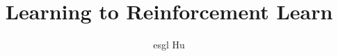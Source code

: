 \documentclass[12pt,a4paper]{article}
\begin{document}
\title{Learning to Reinforcement Learn\cite{Wang2016Learning}}
\author{esgl Hu}
\maketitle



\end{document}
